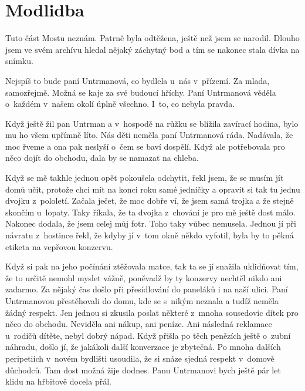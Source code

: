 
\chapter{Modlidba}

Tuto část Mostu neznám. Patrně byla odtěžena, ještě než jsem se narodil. Dlouho
jsem ve svém archívu hledal nějaký záchytný bod a tím se nakonec stala dívka na
snímku.

Nejspíš to bude paní Untrmanová, co bydlela u~nás v~přízemí. Za mlada,
samozřejmě. Možná se kaje za své budoucí hříchy. Paní Untrmanová věděla
o~každém v~našem okolí úplně všechno. I~to, co nebyla pravda.

Když ještě žil pan Untrman a v~hospodě na růžku se blížila zavírací hodina,
bylo mu ho všem upřímně líto. Nás děti neměla paní Untrmanová ráda. Nadávala,
že moc řveme a ona pak neslyší o~čem se baví dospělí. Když ale potřebovala pro
něco dojít do obchodu, dala by se namazat na chleba.

Když se mě takhle jednou opět pokoušela odchytit, řekl jsem, že se musím jít
domů učit, protože chci mít na konci roku samé jedničky a opravit si tak tu
jednu dvojku z~pololetí. Začala ječet, že moc dobře ví, že jsem samá trojka a
že stejně skončím u~lopaty. Taky říkala, že ta dvojka z~chování je pro mě ještě
dost málo. Nakonec dodala, že jsem celej můj fotr. Toho taky vůbec nemusela.
Jednou jí při návratu z~hostince řekl, že kdyby jí v~tom okně někdo vyfotil,
byla by to pěkná etiketa na vepřovou konzervu.

Když si pak na jeho počínání ztěžovala matce, tak ta se jí snažila uklidňovat
tím, že to určitě nemohl myslet vážně, poněvadž by ty konzervy nechtěl nikdo
ani zadarmo. Za nějaký čas došlo při přesídlování do paneláků i na naší ulici.
Paní Untrmanovou přestěhovali do domu, kde se s~nikým neznala a tudíž neměla
žádný respekt. Jen jednou si zkusila poslat některé z~mnoha sousedovic dítek
pro něco do obchodu. Neviděla ani nákup, ani peníze. Ani následná reklamace
u~rodičů dítěte, nebyl dobrý nápad. Když přišla po těch penězích ještě o~zubní
náhradu, došlo jí, že jakákoli další konverzace je zbytečná. Po mnoha dalších
peripetiích v~novém bydlišti usoudila, že si snáze sjedná respekt v~domově
důchodců. Tam dost možná žije dodnes. Panu Untrmanovi bych ještě pár let klidu
na hřbitově docela přál.

